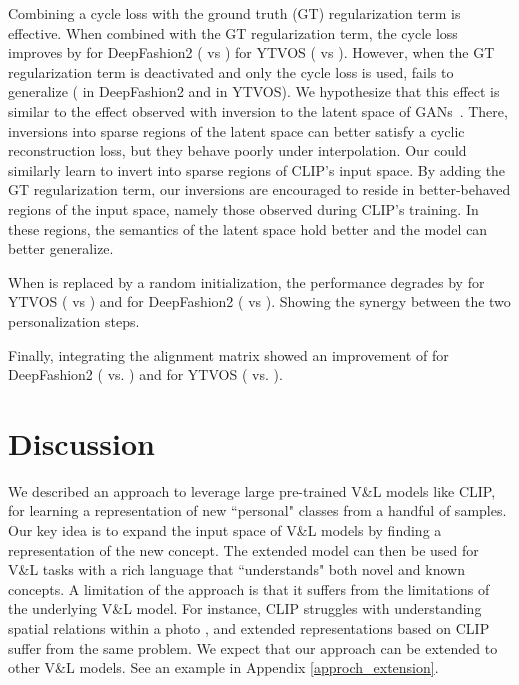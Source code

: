 \documentclass[runningheads]{llncs}
\newcommand{\VL}{V\&L {}}
\begin{document}
Combining a cycle loss with the ground truth (GT) regularization term is effective. When combined with the GT regularization term, the cycle loss improves by  for DeepFashion2 ( vs )   for YTVOS ( vs ). However, when the GT regularization term is deactivated and only the cycle loss is used,  fails to generalize ( in DeepFashion2 and  in YTVOS).
We hypothesize that this effect is similar to the effect observed with inversion to the latent space of GANs~\cite{tov2021designing}.
There, inversions into sparse regions of the latent space can better satisfy a cyclic reconstruction loss, but they behave poorly under interpolation. Our  could similarly learn to invert into sparse regions of CLIP's input space. By adding the GT regularization term, our inversions are encouraged to reside in better-behaved regions of the input space, namely those observed during CLIP's training. In these regions, the semantics of the latent space hold better and the model can better generalize. 


When  is replaced by a random initialization, the performance degrades by  for YTVOS ( vs ) and  for DeepFashion2 ( vs ). Showing the synergy between the two personalization steps.

Finally, integrating the alignment matrix  showed an improvement of   for DeepFashion2 ( vs. ) and  for YTVOS ( vs. ).





\section{Discussion}

We described an approach to leverage large pre-trained \VL models like CLIP, for learning a representation of new ``personal" classes from a handful of samples. Our key idea is to expand the input space of \VL models by finding a representation of the new concept. The extended model can then be used for \VL tasks with a rich language that ``understands" both novel and known concepts. A limitation of the approach is that it suffers from the limitations of the underlying \VL model. For instance, CLIP struggles with understanding spatial relations within a photo \cite{liu2021learning}, and extended representations based on CLIP suffer from the same problem. We expect that our approach can be extended to other \VL models. See an example in Appendix \ref{approch_extension}. 
\end{document}
